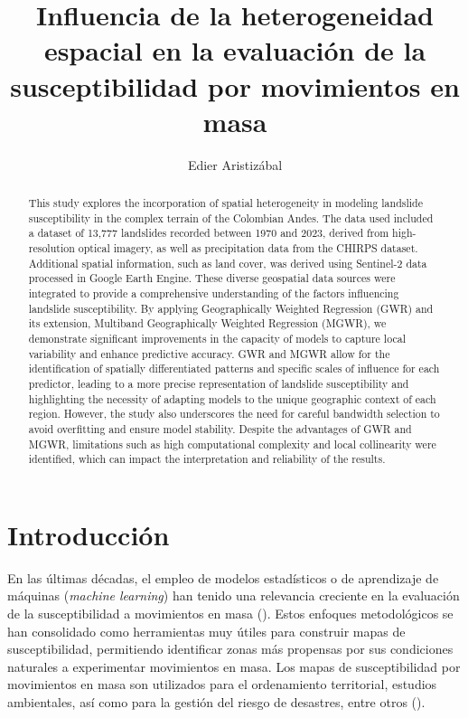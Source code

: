 \documentclass[
  manuscript=article,  
  layout=preprint,  
]{format}
\title{Influencia de la heterogeneidad espacial en la evaluación de la susceptibilidad por movimientos en masa}
\author{Edier Aristizábal}
\affiliation{Departamento de Geociencias y Medio Ambiente, Universidad Nacional de Colombia, Medellín, Colombia}
\begin{document}
\begin{abstract}
This study explores the incorporation of spatial heterogeneity in modeling landslide susceptibility in the complex terrain of the Colombian Andes. The data used included a dataset of 13,777 landslides recorded between 1970 and 2023, derived from high-resolution optical imagery, as well as precipitation data from the CHIRPS dataset. Additional spatial information, such as land cover, was derived using Sentinel-2 data processed in Google Earth Engine. These diverse geospatial data sources were integrated to provide a comprehensive understanding of the factors influencing landslide susceptibility. By applying Geographically Weighted Regression (GWR) and its extension, Multiband Geographically Weighted Regression (MGWR), we demonstrate significant improvements in the capacity of models to capture local variability and enhance predictive accuracy. GWR and MGWR allow for the identification of spatially differentiated patterns and specific scales of influence for each predictor, leading to a more precise representation of landslide susceptibility and highlighting the necessity of adapting models to the unique geographic context of each region. However, the study also underscores the need for careful bandwidth selection to avoid overfitting and ensure model stability. Despite the advantages of GWR and MGWR, limitations such as high computational complexity and local collinearity were identified, which can impact the interpretation and reliability of the results.
\end{abstract}

\section{Introducción}
En las últimas décadas, el empleo de modelos estadísticos o de aprendizaje de máquinas (\textit{machine learning}) han tenido una relevancia creciente en la evaluación de la susceptibilidad a movimientos en masa (\cite{aristizabal2015susceptibility, tehrani2022machine, korup2014landslide}). Estos enfoques metodológicos se han consolidado como herramientas muy útiles para construir mapas de susceptibilidad, permitiendo identificar zonas más propensas por sus condiciones naturales a experimentar movimientos en masa. Los mapas de susceptibilidad por movimientos en masa son utilizados para el ordenamiento territorial, estudios ambientales, así como para la gestión del riesgo de desastres, entre otros (\cite{guzzetti1999landslide, soeters1996, corominas2014recommendations}).
\end{document}
